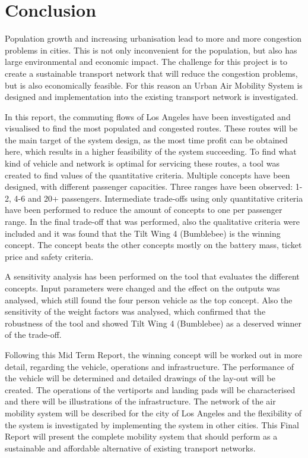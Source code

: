 \newpage
\chapter{Conclusion}
\label{Conclusion}

Population growth and increasing urbanisation lead to more and more congestion problems in cities. This is not only inconvenient for the population, but also has large environmental and economic impact. The challenge for this project is to create a sustainable transport network that will reduce the congestion problems, but is also economically feasible. For this reason an Urban Air Mobility System is designed and implementation into the existing transport network is investigated. 

In this report, the commuting flows of Los Angeles have been investigated and visualised to find the most populated and congested routes. These routes will be the main target of the system design, as the most time profit can be obtained here, which results in a higher feasibility of the system succeeding. To find what kind of vehicle and network is optimal for servicing these routes, a tool was created to find values of the quantitative criteria. Multiple concepts have been designed, with different passenger capacities. Three ranges have been observed: 1-2, 4-6 and 20+ passengers. Intermediate trade-offs using only quantitative criteria have been performed to reduce the amount of concepts to one per passenger range. In the final trade-off that was performed, also the qualitative criteria were included and it was found that the Tilt Wing 4 (Bumblebee) is the winning concept. The concept beats the other concepts mostly on the battery mass, ticket price and safety criteria. 

A sensitivity analysis has been performed on the tool that evaluates the different concepts. Input parameters were changed and the effect on the outputs was analysed, which still found the four person vehicle as the top concept. Also the sensitivity of the weight factors was analysed, which confirmed that the robustness of the tool and showed Tilt Wing 4 (Bumblebee) as a deserved winner of the trade-off. 

Following this Mid Term Report, the winning concept will be worked out in more detail, regarding the vehicle, operations and infrastructure. The performance of the vehicle will be determined and detailed drawings of the lay-out will be created. The operations of the vertiports and landing pads will be characterised and there will be illustrations of the infrastructure. The network of the air mobility system will be described for the city of Los Angeles and the flexibility of the system is investigated by implementing the system in other cities. This Final Report will present the complete mobility system that should perform as a sustainable and affordable alternative of existing transport networks. 



